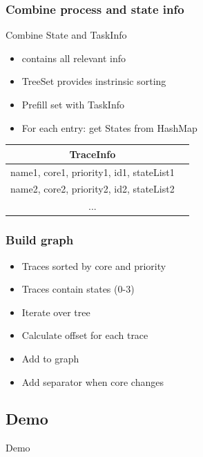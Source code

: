 \documentclass{beamer}
\begin{document}
\begin{frame}
	\frametitle{Combine process and state info}
	\begin{block}{Combine State and TaskInfo}
		\begin{itemize}
			\item contains all relevant info
			\item TreeSet provides instrinsic sorting
			\item Prefill set with TaskInfo
			\item For each entry: get States from HashMap
		\end{itemize}
	\end{block}
	\vspace{2mm}
	\begin{tabular}{|c|c|}
		\hline 
		\textbf{TraceInfo}  \\
		\hline 
		name1, core1, priority1, id1, stateList1 \\
		\hline 
		name2, core2, priority2, id2, stateList2  \\ 
		\hline 
		...  \\ 
		\hline 
	\end{tabular}
\end{frame}

\begin{frame}
	\frametitle{Build graph}
	\begin{block}{}
		\begin{itemize}
			\item Traces sorted by core and priority
			\item Traces contain states (0-3)
			\item Iterate over tree
			\item Calculate offset for each trace
			\item Add to graph
			\item Add separator when core changes
		\end{itemize}
	\end{block}
\end{frame}




\begin{frame}

\section{Demo}
	\centering
	\huge
	Demo
\end{frame}
\end{document}
